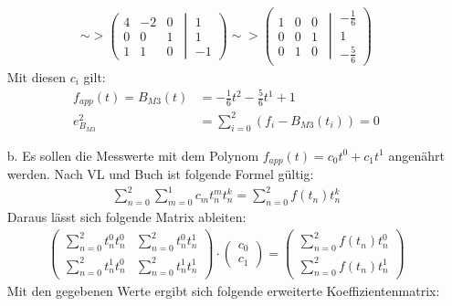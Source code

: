 \begin{itemize}
\begin{align*}
			\sim> \left(\left.\begin{matrix} 4 & -2 & 0\\0 & 0 & 1\\ 1 & 1 & 0\end{matrix}\ \ \right|\ \begin{matrix}1 \\ 1 \\ -1 \end{matrix}\right)
			\sim> \left(\left.\begin{matrix} 1 & 0 & 0\\0 & 0 & 1\\ 0 & 1 & 0\end{matrix}\ \ \right|\ \begin{matrix}-\frac{1}{6} \\ 1 \\ -\frac{5}{6} \end{matrix}\right)
		\end{align*}
		Mit diesen $c_i$ gilt:
		\begin{align*}
			f_{app}(t) = B_{M3}(t)	&= -\frac{1}{6}t^2 -\frac{5}{6}t^1 +1\\
			e_{B_{M3}}^2			&= \sum_{i=0}^2\left( f_i - B_{M3}(t_i) \right)= 0
		\end{align*}
		\item[b.] Es sollen die Messwerte mit dem Polynom $f_{app}(t) = c_0t^0 +c_1t^1$ angenährt werden. Nach VL und Buch ist folgende Formel gültig:
		\begin{align*}
			\sum_{n=0}^2\sum_{m=0}^1c_m t_n^mt_n^k = \sum_{n=0}^2f(t_n)t_n^k
		\end{align*}
		Daraus lässt sich folgende Matrix ableiten:
		\begin{align*}
			\left(\begin{matrix}
				\sum_{n=0}^2 t_n^0t_n^0 & \sum_{n=0}^2 t_n^0t_n^1\\
				\sum_{n=0}^2 t_n^1t_n^0 & \sum_{n=0}^2 t_n^1t_n^1
			\end{matrix}\right)\cdot\left(\begin{matrix} c_0\\ c_1\end{matrix}\right)
			=
			\left(\begin{matrix}
				\sum_{n=0}^{2}f(t_n)t_n^0\\
				\sum_{n=0}^2f(t_n)t_n^1
			\end{matrix}\right)
		\end{align*}
		Mit den gegebenen Werte ergibt sich folgende erweiterte Koeffizientenmatrix:
		\begin{align*}

\end{align*}
\end{itemize}
